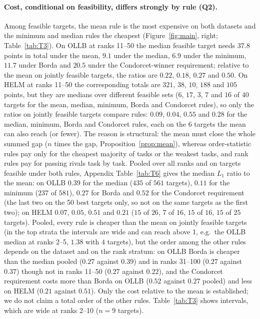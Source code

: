 \documentclass{article}
\begin{document}
\paragraph{Cost, conditional on feasibility, differs strongly by rule (Q2).}
Among feasible targets, the mean rule is the most expensive on both datasets and the minimum and median rules the cheapest (Figure~\ref{fig:main}, right; Table~\ref{tab:T3}). On OLLB at ranks 11--50 the median feasible target needs $37.8$ points in total under the mean, $9.1$ under the median, $6.9$ under the minimum, $11.7$ under Borda and $20.5$ under the Condorcet-winner requirement; relative to the mean on jointly feasible targets, the ratios are $0.22$, $0.18$, $0.27$ and $0.50$. On HELM at ranks 11--50 the corresponding totals are $321$, $38$, $10$, $188$ and $105$ points, but they are medians over different feasible sets ($6$, $17$, $3$, $7$ and $16$ of $40$ targets for the mean, median, minimum, Borda and Condorcet rules), so only the ratios on jointly feasible targets compare rules: $0.09$, $0.04$, $0.55$ and $0.28$ for the median, minimum, Borda and Condorcet rules, each on the $6$ targets the mean can also reach (or fewer). The reason is structural: the mean must close the whole summed gap ($n$ times the gap, Proposition~\ref{prop:mean}), whereas order-statistic rules pay only for the cheapest majority of tasks or the weakest tasks, and rank rules pay for passing rivals task by task. Pooled over all ranks and on targets feasible under both rules, Appendix Table~\ref{tab:T6} gives the median $L_1$ ratio to the mean: on OLLB $0.39$ for the median ($435$ of $561$ targets), $0.11$ for the minimum ($237$ of $581$), $0.27$ for Borda and $0.52$ for the Condorcet requirement (the last two on the 50 best targets only, so not on the same targets as the first two); on HELM $0.07$, $0.05$, $0.51$ and $0.21$ ($15$ of $26$, $7$ of $16$, $15$ of $16$, $15$ of $25$ targets). Pooled, every rule is cheaper than the mean on jointly feasible targets (in the top strata the intervals are wide and can reach above 1, e.g.\ the OLLB median at ranks 2--5, $1.38$ with $4$ targets), but the order among the other rules depends on the dataset and on the rank stratum: on OLLB Borda is cheaper than the median pooled ($0.27$ against $0.39$) and in ranks 31--100 ($0.27$ against $0.37$) though not in ranks 11--50 ($0.27$ against $0.22$), and the Condorcet requirement costs more than Borda on OLLB ($0.52$ against $0.27$ pooled) and less on HELM ($0.21$ against $0.51$). Only the cost relative to the mean is established; we do not claim a total order of the other rules. Table~\ref{tab:T3} shows intervals, which are wide at ranks 2--10 ($n=9$ targets).
\end{document}
